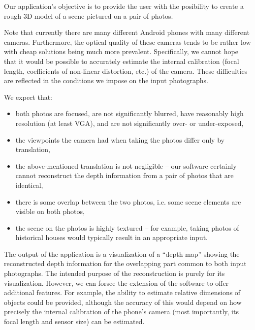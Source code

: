 Our application's objective is to provide the user with the posibility to create a rough 3D model of a scene pictured on a pair of photos. 

Note that currently there are many different Android phones with many different cameras. 
Furthermore, the optical quality of these cameras tends to be rather low with cheap solutions being much more prevalent.
Specifically, we cannot hope that it would be possible to accurately estimate the internal calibration (focal length, coefficients of non-linear distortion, etc.) of the camera. 
These difficulties are reflected in the conditions we impose on the input photographs.

We expect that: 
\begin{itemize}
\item both photos are focused, are not significantly blurred, have reasonably high resolution (at least VGA), and are not significantly over- or under-exposed, 
\item the viewpoints the camera had when taking the photos differ only by translation, 
\item the above-mentioned translation is not negligible -- our software certainly cannot reconstruct the depth information from a pair of photos that are identical,
\item there is some overlap between the two photos, i.e. some scene elements are visible on both photos,
\item the scene on the photos is highly textured -- for example, taking photos of historical houses would typically result in an appropriate input.
\end{itemize}

The output of the application is a visualization of a ``depth map'' showing the reconstructed depth information for the overlapping part common to both input photographs. 
The intended purpose of the reconstruction is purely for its visualization. 
However, we can forsee the extension of the software to offer additional features. 
For example, the ability to estimate relative dimensions of objects could be provided, although the accuracy of this would depend on how precisely the internal calibration of the phone's camera (most importantly, its focal length and sensor size) can be estimated. %
















